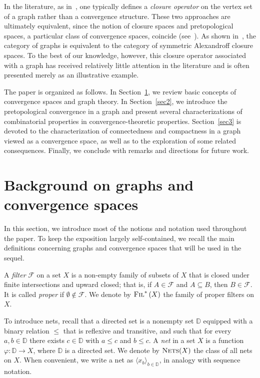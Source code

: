 \documentclass{amsart}
\newcommand{\Fil}[1]{\textsc{Fil}^*\left(#1\right)}
\theoremstyle{definition}
\theoremstyle{remark}
\numberwithin{equation}{section}
\begin{document}
In the literature, as in~\cite{catclosure,ghanim1993compact,milićević2024directedvietorisripscomplexhomotopy,probconv,ShokryYousif2011}, one typically defines a \emph{closure operator} on the vertex set of a graph rather than a convergence structure. These two approaches are ultimately equivalent, since the notion of closure spaces and pretopological spaces, a particular class of convergence spaces, coincide (see~\cite{Cech1966}).    As shown in~\cite{BubenikMilicevic2024,catclosure}, the category of graphs is equivalent to the category of symmetric Alexandroff closure spaces.
To the best of our knowledge, however, this closure operator associated with a graph has received relatively little attention in the literature and is often presented merely as an illustrative example.

The paper is organized as follows. In Section~\ref{sec1}, we review basic concepts of convergence spaces and graph theory. In Section~\ref{sec2}, we introduce the pretopological convergence in a graph and present several characterizations of combinatorial properties in convergence-theoretic properties. Section~\ref{sec3} is devoted to the characterization of connectedness and compactness in a graph viewed as a convergence space, as well as to the exploration of some related consequences. Finally, we conclude with remarks and directions for future work.


\section{Background on graphs and convergence spaces}
\label{sec1}

In this section, we introduce most of the notions and notation used throughout the paper. To keep the exposition largely self-contained, we recall the main definitions concerning graphs and convergence spaces that will be used in the sequel.

 A \emph{filter} $\mathcal{F}$ on a set $X$ is a non-empty family of subsets of $X$ that is closed under finite intersections and upward closed; that is, if $A\in\mathcal{F}$ and $A\subseteq B$, then $B\in\mathcal{F}$. It is called \emph{proper} if $\emptyset\notin\mathcal{F}$. We denote by $\Fil{X}$ the family of proper filters on $X$.

To introduce nets, recall that a directed set is a nonempty set $\mathbb{D}$ equipped with a binary relation $\leq$ that is reflexive and transitive, and such that for every $a,b\in\mathbb{D}$ there exists $c\in\mathbb{D}$ with $a\leq c$ and $b\leq c$. A \emph{net} in a set $X$ is a function $\varphi\colon\mathbb{D}\to X$, where $\mathbb{D}$ is a directed set. We denote by $\textsc{Nets}(X)$ the class of all nets on $X$. When convenient, we write a net as $\langle x_b\rangle_{b\in\mathbb{D}}$, in analogy with sequence notation.
\end{document}
